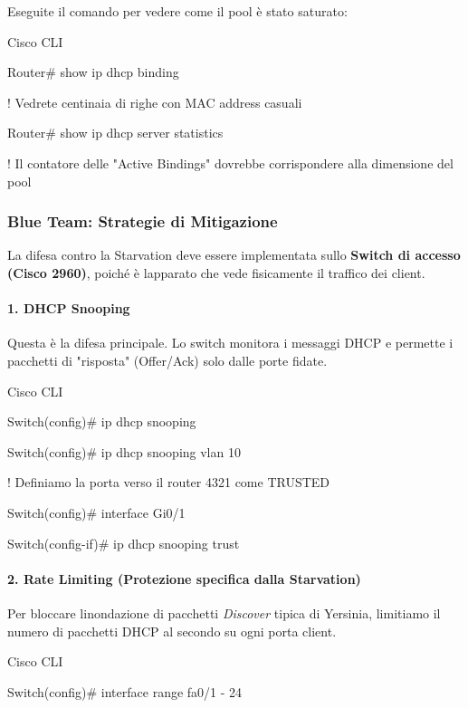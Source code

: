 \documentclass[11pt,a4paper]{article}
\begin{document}
Eseguite il comando per vedere come il pool è stato saturato:

Cisco CLI

Router\# show ip dhcp binding

! Vedrete centinaia di righe con MAC address casuali

Router\# show ip dhcp server statistics

! Il contatore delle "Active Bindings" dovrebbe corrispondere alla
dimensione del pool

\subsubsection{Blue Team: Strategie di
Mitigazione}\label{blue-team-strategie-di-mitigazione}

La difesa contro la Starvation deve essere implementata sullo
\textbf{Switch di accesso (Cisco 2960)}, poiché è
l\textquotesingle apparato che vede fisicamente il traffico dei client.

\paragraph{1. DHCP Snooping}\label{dhcp-snooping}

Questa è la difesa principale. Lo switch monitora i messaggi DHCP e
permette i pacchetti di "risposta" (Offer/Ack) solo dalle porte fidate.

Cisco CLI

Switch(config)\# ip dhcp snooping

Switch(config)\# ip dhcp snooping vlan 10

! Definiamo la porta verso il router 4321 come TRUSTED

Switch(config)\# interface Gi0/1

Switch(config-if)\# ip dhcp snooping trust

\paragraph{2. Rate Limiting (Protezione specifica dalla
Starvation)}\label{rate-limiting-protezione-specifica-dalla-starvation}

Per bloccare l\textquotesingle inondazione di pacchetti \emph{Discover}
tipica di Yersinia, limitiamo il numero di pacchetti DHCP al secondo su
ogni porta client.

Cisco CLI

Switch(config)\# interface range fa0/1 - 24
\end{document}
